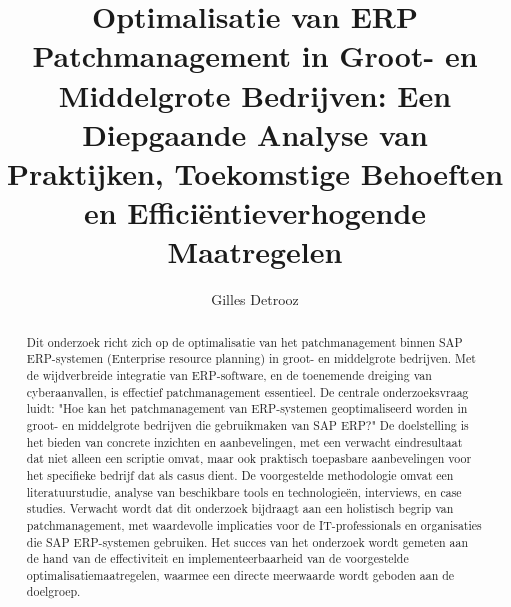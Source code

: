 \documentclass{hogent-article}
\title{Optimalisatie van ERP Patchmanagement in Groot- en Middelgrote Bedrijven: Een Diepgaande Analyse van Praktijken, Toekomstige Behoeften en Efficiëntieverhogende Maatregelen}
\author{Gilles Detrooz}
\begin{document}
\begin{abstract}
    Dit onderzoek richt zich op de optimalisatie van het patchmanagement binnen SAP ERP-systemen (Enterprise resource planning) in groot- en middelgrote bedrijven. Met de wijdverbreide integratie van ERP-software, en de toenemende dreiging van cyberaanvallen, is effectief patchmanagement essentieel. De centrale onderzoeksvraag luidt: "Hoe kan het patchmanagement van ERP-systemen geoptimaliseerd worden in groot- en middelgrote bedrijven die gebruikmaken van SAP ERP?" De doelstelling is het bieden van concrete inzichten en aanbevelingen, met een verwacht eindresultaat dat niet alleen een scriptie omvat, maar ook praktisch toepasbare aanbevelingen voor het specifieke bedrijf dat als casus dient. De voorgestelde methodologie omvat een literatuurstudie, analyse van beschikbare tools en technologieën, interviews, en case studies. Verwacht wordt dat dit onderzoek bijdraagt aan een holistisch begrip van patchmanagement, met waardevolle implicaties voor de IT-professionals en organisaties die SAP ERP-systemen gebruiken. Het succes van het onderzoek wordt gemeten aan de hand van de effectiviteit en implementeerbaarheid van de voorgestelde optimalisatiemaatregelen, waarmee een directe meerwaarde wordt geboden aan de doelgroep.
\tableofcontents
\end{abstract}



\printbibliography[heading=bibintoc]
\end{document}
